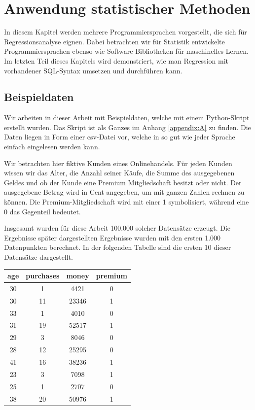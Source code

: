 \chapter{Anwendung statistischer Methoden}
\label{chapter:3}

In diesem Kapitel werden mehrere Programmiersprachen vorgestellt, die sich für Regressionsanalyse eignen. Dabei betrachten wir für Statistik entwickelte Programmiersprachen ebenso wie Software-Bibliotheken für maschinelles Lernen. Im letzten Teil dieses Kapitels wird demonstriert, wie man Regression mit vorhandener SQL-Syntax umsetzen und durchführen kann.

\section{Beispieldaten}
\label{section:3:1}

Wir arbeiten in dieser Arbeit mit Beispieldaten, welche mit einem Python-Skript erstellt wurden. Das Skript ist als Ganzes im Anhang \ref{appendix:A} zu finden. Die Daten liegen in Form einer csv-Datei vor, welche in so gut wie jeder Sprache einfach eingelesen werden kann.

Wir betrachten hier fiktive Kunden eines Onlinehandels. Für jeden Kunden wissen wir das Alter, die Anzahl seiner Käufe, die Summe des ausgegebenen Geldes und ob der Kunde eine Premium Mitgliedschaft besitzt oder nicht. Der ausgegebene Betrag wird in Cent angegeben, um mit ganzen Zahlen rechnen zu können. Die Premium-Mitgliedschaft wird mit einer 1 symbolisiert, während eine 0 das Gegenteil bedeutet.

Insgesamt wurden für diese Arbeit 100.000 solcher Datensätze erzeugt. Die Ergebnisse später dargestellten Ergebnisse wurden mit den ersten 1.000 Datenpunkten berechnet. In der folgenden Tabelle sind die ersten 10 dieser Datensätze dargestellt.

\begin{center}
  \begin{tabular}{|c|c|c|c|}\hline
    \textbf{age} & \textbf{purchases} & \textbf{money} & \textbf{premium} \\ \hline
    30 & 1 & 4421 & 0 \\ \hline
    30 & 11 & 23346 & 1 \\ \hline
    33 & 1 & 4010 & 0 \\ \hline
    31 & 19 & 52517 & 1 \\ \hline
    29 & 3 & 8046 & 0 \\ \hline
    28 & 12 & 25295 & 0 \\ \hline
    41 & 16 & 38236 & 1 \\ \hline
    23 & 3 & 7098 & 1 \\ \hline
    25 & 1 & 2707 & 0 \\ \hline
    38 & 20 & 50976 & 1 \\ \hline
  \end{tabular}
\end{center}


